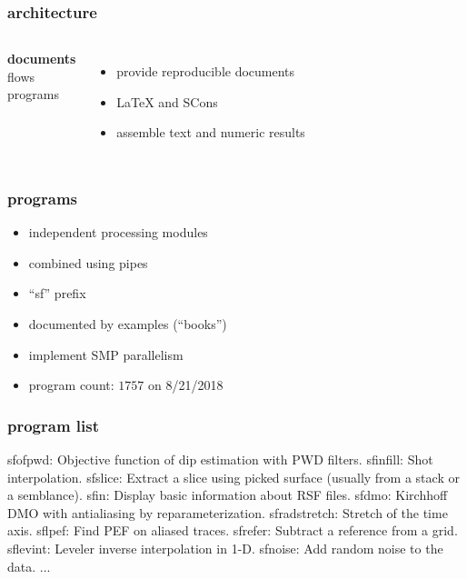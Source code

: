 \begin{frame} \frametitle{\mg architecture}

  \begin{columns}
    \textbf{documents} \\
    \vspace{0.25in}
    flows \\
    \vspace{0.25in}
    programs
    
    \begin{itemize}
    \item provide reproducible documents
    \item \LaTeX\; and SCons
    \item assemble text and numeric results
    \end{itemize}
    
  \end{columns}
  
\end{frame}
\cwpnote{}


\begin{frame} \frametitle{programs}

  \begin{itemize}
  \item independent processing modules
  \item combined using pipes
  \item ``sf'' prefix
  \item documented by examples (``books'')
  \item implement SMP parallelism
  \item program count: $1757$ on 8/21/2018
  \end{itemize}
  
\end{frame}
\cwpnote{}

\begin{frame}[fragile] \frametitle{program list}
  

  \tiny
  \begin{semiverbatim}
    sfofpwd: Objective function of dip estimation with PWD filters.
    sfinfill: Shot interpolation.
    sfslice: Extract a slice using picked surface (usually from a stack or a semblance).
    sfin: Display basic information about RSF files.
    sfdmo: Kirchhoff DMO with antialiasing by reparameterization.
    sfradstretch: Stretch of the time axis.
    sflpef: Find PEF on aliased traces.
    sfrefer: Subtract a reference from a grid.
    sflevint: Leveler inverse interpolation in 1-D.
    sfnoise: Add random noise to the data.
    ...
  \end{semiverbatim}

\end{frame}
\cwpnote{}

